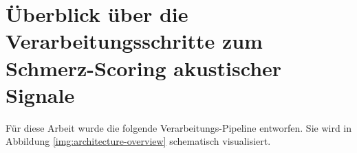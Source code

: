 \section{Überblick über die Verarbeitungsschritte zum Schmerz-Scoring akustischer Signale}
\label{sec:pipeline}


Für diese Arbeit wurde die folgende Verarbeitungs-Pipeline entworfen. Sie wird in Abbildung \autoref{img:architecture-overview} schematisch visualisiert. 
\vspace{4mm}

